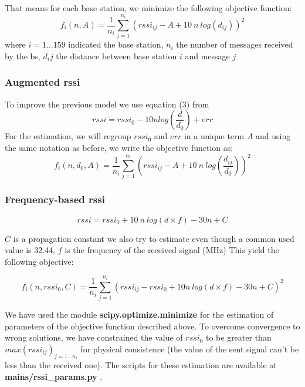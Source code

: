 \documentclass[twocolumn,2pt]{article}
\begin{document}
	That means for each base station, we minimize the following objective function:
	\begin{equation}
	\label{naive_rssi_objective}
	f_i(n, A) = \frac{1}{n_i} \sum_{j=1}^{n_i} (rssi_{ij} -A + 10 \ n \ log(d_{ij}))^2
	\end{equation}
	where $i=1\dots 159$ indicated the base station, $n_i$ the number of messages received by the bs, $d_ij$ the distance between base station $i$ and message $j$
	
	
	\subsubsection*{Augmented rssi}
	To improve the previous model we use equation (3) from \cite{Chiputa2018}
	\begin{equation}
	\label{augmented_rssi}
	rssi = rssi_0 - 10 n log(\frac{d}{d_0}) + err
	\end{equation}
	For the estimation, we will regroup $rssi_0$ and $err$ in a unique term $A$ and using the same notation as before, we write the objective function as:
	\begin{equation}
	\label{augmented_rssi_objective}
	f_i(n, d_0, A) = \frac{1}{n_i} \sum_{j=1}^{n_i} (rssi_{ij} -A + 10 \ n \ log(\frac{d_{ij}}{d_0}))^2
	\end{equation}
	
	
	\subsubsection*{Frequency-based rssi} 
	\begin{equation}
	\label{freq_rssi}
	rssi = rssi_0 + 10 \ n \ log(d \times f) - 30n + C
	\end{equation}
	
	$C$ is a propagation constant we also try to estimate even though a common used value is 32.44, $f$ is the frequency of the received signal (MHz) %
	This yield the following objective:
	
	\begin{equation}
	\label{freq_rssi_objective}
	f_i(n, rssi_0, C) = \frac{1}{n_i} \sum_{j=1}^{n_i} (rssi_{ij} - rssi_0 + 10n \ log(d \times f) - 30n + C)^2
	\end{equation}
	
	We have used the module \textbf{scipy.optimize.minimize} for the estimation of parameters of the objective function described above. To overcome convergence to wrong solutions, we have constrained the value of $rssi_0$ to be greater than $max(rssi_{ij})_{j=1 \dots n_i}$ for physical consistence (the value of the sent signal can't be less than the received one). The scripts for these estimation are available at \textbf{mains/rssi\_params.py} .
	
\end{document}
